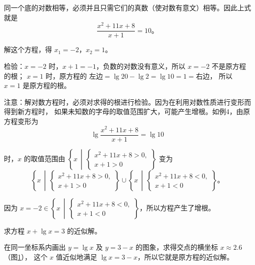 同一个底的对数相等，必须并且只需它们的真数（使对数有意文）相等。因此上式就是
$$\dfrac{x^2 + 11x + 8}{x + 1} = 10 \text{。}$$

解这个方程，得 $x_1 = -2$，$x_2 = 1$。

检验：$x = -2$ 时，$x + 1 = -1$，负数的对数没有意义，所以 $x = -2$ 不是原方程的根；
$x = 1$ 时，原方程的 $\text{左边} = \lg 20 - \lg2 = \lg 10 = 1 = \text{右边}$，
所以 $x = 1$ 是原方程的根。

注意：解对数方程时，必须对求得的根进行检验。因为在利用对数性质进行变形而得到新方程时，
如果未知数的字母的取值范围扩大，可能产生增根。如例4，由原方程变形为
\vspace{0.5em}
$$\lg \dfrac{x^2 + 11x + 8}{x + 1} = \lg 10$$

时，$x$ 的取值范围由 $\left\{ x \,\middle|\, 
\begin{cases}
    x^2 + 11x + 8 > 0, \\
    x + 1 > 0
\end{cases} \right\}$ 变为
$$
\left\{ x \,\middle|\, 
\begin{cases}
    x^2 + 11x + 8 > 0, \\
    x + 1 > 0
\end{cases} \right\}
\cup
\left\{ x \,\middle|\, 
\begin{cases}
    x^2 + 11x + 8 < 0, \\
    x + 1 < 0
\end{cases} \right\} \text{。}
$$

因为 $x = -2 \in \left\{ x \,\middle|\, 
\begin{cases}
    x^2 + 11x + 8 < 0, \\
    x + 1 < 0
\end{cases} \right\}$，所以方程产生了增根。

\liti 求方程 $x + \lg x = 3$ 的近似解。

\jie 在同一坐标系内画出 $y = \lg x$ 及 $y = 3 - x$ 的图象，求得交点的横坐标 $x \approx 2.6$（图\ref{fig:1-31}），
这个 $x$ 值近似地满足 $\lg x = 3 - x$，所以它就是原方程的近似解。

\begin{figure}[htbp]
    \centering
    
    \caption{}\label{fig:1-31}
\end{figure}

